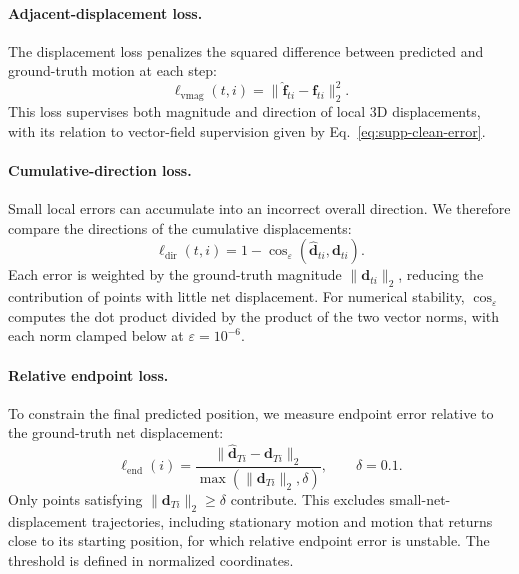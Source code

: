 \paragraph{Adjacent-displacement loss.}
The displacement loss penalizes the squared difference between predicted
and ground-truth motion at each step:
\begin{equation}
\ell_{\mathrm{vmag}}(t,i)
=\|\widehat{\mathbf{f}}_{ti}-\mathbf{f}_{ti}\|_2^2.
\label{eq:supp-vmag}
\end{equation}
This loss supervises both magnitude and direction of local 3D
displacements, with its relation to vector-field supervision given
by Eq.~\eqref{eq:supp-clean-error}.

\paragraph{Cumulative-direction loss.}
Small local errors can accumulate into an incorrect overall direction.
We therefore compare the directions of the cumulative displacements:
\begin{equation}
\ell_{\mathrm{dir}}(t,i)
=1-\operatorname{cos}_{\varepsilon}
(\widehat{\mathbf{d}}_{ti},\mathbf{d}_{ti}).
\label{eq:supp-dir}
\end{equation}
Each error is weighted by the ground-truth magnitude
$\|\mathbf{d}_{ti}\|_2$, reducing the contribution of points with little
net displacement. For numerical stability,
$\operatorname{cos}_{\varepsilon}$ computes the dot product divided by
the product of the two vector norms, with each norm clamped below at
$\varepsilon=10^{-6}$.

\paragraph{Relative endpoint loss.}
To constrain the final predicted position, we measure endpoint error
relative to the ground-truth net displacement:
\begin{equation}
\ell_{\mathrm{end}}(i)
=\frac{
\|\widehat{\mathbf{d}}_{Ti}-\mathbf{d}_{Ti}\|_2
}{\max(\|\mathbf{d}_{Ti}\|_2,\delta)},
\qquad \delta=0.1.
\label{eq:supp-end}
\end{equation}
Only points satisfying $\|\mathbf{d}_{Ti}\|_2\geq\delta$ contribute.
This excludes small-net-displacement trajectories, including stationary
motion and motion that returns close to its starting position, for which
relative endpoint error is unstable. The threshold is defined in normalized
coordinates.

